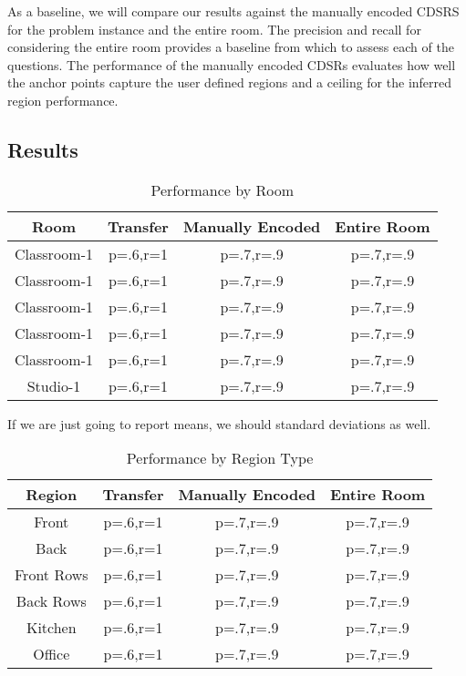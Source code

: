 \documentclass[letterpaper]{article}
\begin{document}
As a baseline, we will compare our results against the manually encoded CDSRS for the problem instance and the entire room. The precision and recall for considering the entire room provides a baseline from which to assess each of the questions. The performance of the manually encoded CDSRs evaluates how well the anchor points capture the user defined regions and a ceiling for the inferred region performance.

\subsection{Results}
\begin{table}
\caption{Performance by Room}
\begin{tabular}{|c|c|c|c|}
\hline
Room & Transfer & Manually Encoded & Entire Room \\
\hline
Classroom-1 & p=.6,r=1 & p=.7,r=.9 & p=.7,r=.9 \\
Classroom-1 & p=.6,r=1 & p=.7,r=.9 & p=.7,r=.9 \\
Classroom-1 & p=.6,r=1 & p=.7,r=.9 & p=.7,r=.9 \\
Classroom-1 & p=.6,r=1 & p=.7,r=.9 & p=.7,r=.9 \\
Classroom-1 & p=.6,r=1 & p=.7,r=.9 & p=.7,r=.9 \\
Studio-1 & p=.6,r=1 & p=.7,r=.9 & p=.7,r=.9 \\
\hline
\end{tabular}
\end{table}

If we are just going to report means, we should standard deviations as well.

\begin{table}
\caption{Performance by Region Type}
\begin{tabular}{|c|c|c|c|}
\hline
Region & Transfer & Manually Encoded & Entire Room \\
\hline
Front & p=.6,r=1 & p=.7,r=.9 & p=.7,r=.9 \\
Back & p=.6,r=1 & p=.7,r=.9 & p=.7,r=.9 \\
Front Rows & p=.6,r=1 & p=.7,r=.9 & p=.7,r=.9 \\
Back Rows & p=.6,r=1 & p=.7,r=.9 & p=.7,r=.9 \\
Kitchen & p=.6,r=1 & p=.7,r=.9 & p=.7,r=.9 \\
Office & p=.6,r=1 & p=.7,r=.9 & p=.7,r=.9 \\
\hline
\end{tabular}
\end{table}
\end{document}
